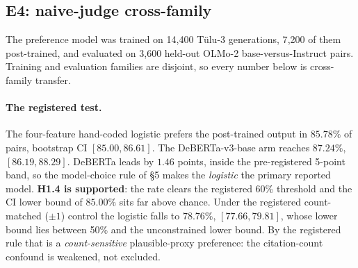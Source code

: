 \subsection{E4: naive-judge cross-family}


The preference model was trained on 14{,}400 Tülu-3 generations, 7{,}200 of them
post-trained, and evaluated on 3{,}600 held-out OLMo-2 base-versus-Instruct
pairs. Training and evaluation families are disjoint, so every number below is
cross-family transfer.

\paragraph{The registered test.}
The four-feature hand-coded logistic prefers the post-trained output in
$85.78\%$ of pairs, bootstrap CI $[85.00, 86.61]$. The DeBERTa-v3-base arm
reaches $87.24\%$, $[86.19, 88.29]$. DeBERTa leads by $1.46$ points, inside the
pre-registered 5-point band, so the model-choice rule of §5 makes the
\emph{logistic} the primary reported model. \textbf{H1.4 is supported}: the rate
clears the registered 60\% threshold and the CI lower bound of $85.00\%$ sits far
above chance. Under the registered count-matched ($\pm 1$) control the logistic
falls to $78.76\%$, $[77.66, 79.81]$, whose lower bound lies between 50\% and the
unconstrained lower bound. By the registered rule that is a
\emph{count-sensitive} plausible-proxy preference: the citation-count confound is
weakened, not excluded.

